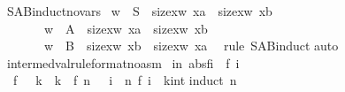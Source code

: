 \begin{isabellebody}
\isanewline
{}\ S{\isacharunderscore}A{\isacharunderscore}B{\isachardot}induct{\isacharbrackleft}no{\isacharunderscore}vars{\isacharbrackright}\isanewline
\isanewline
{}\ {\isachardoublequote}{\isacharparenleft}w\ {\isacharcolon}\ S\ {\isacharminus}{\isacharminus}{\isachargreater}\ size{\isacharbrackleft}x{\isacharcolon}w{\isachardot}\ x{\isacharequal}a{\isacharbrackright}\ {\isacharequal}\ size{\isacharbrackleft}x{\isacharcolon}w{\isachardot}\ x{\isacharequal}b{\isacharbrackright}{\isacharparenright}\ {\isacharampersand}\isanewline
\ \ \ \ \ \ \ {\isacharparenleft}w\ {\isacharcolon}\ A\ {\isacharminus}{\isacharminus}{\isachargreater}\ size{\isacharbrackleft}x{\isacharcolon}w{\isachardot}\ x{\isacharequal}a{\isacharbrackright}\ {\isacharequal}\ size{\isacharbrackleft}x{\isacharcolon}w{\isachardot}\ x{\isacharequal}b{\isacharbrackright}\ {\isacharplus}\ {}{\isacharparenright}\ {\isacharampersand}\isanewline
\ \ \ \ \ \ \ {\isacharparenleft}w\ {\isacharcolon}\ B\ {\isacharminus}{\isacharminus}{\isachargreater}\ size{\isacharbrackleft}x{\isacharcolon}w{\isachardot}\ x{\isacharequal}b{\isacharbrackright}\ {\isacharequal}\ size{\isacharbrackleft}x{\isacharcolon}w{\isachardot}\ x{\isacharequal}a{\isacharbrackright}\ {\isacharplus}\ {}{\isacharparenright}{\isachardoublequote}\isanewline
{}rule\ S{\isacharunderscore}A{\isacharunderscore}B{\isachardot}induct{\isacharparenright}\isanewline
{}auto{\isacharparenright}\isanewline
\isanewline
{}\ intermed{\isacharunderscore}val{\isacharbrackleft}rule{\isacharunderscore}format{\isacharparenleft}no{\isacharunderscore}asm{\isacharparenright}{\isacharbrackright}{\isacharcolon}\isanewline
\ {\isachardoublequote}{\isacharparenleft}{\isacharbang}i{\isacharless}n{\isachardot}\ abs{\isacharparenleft}f{\isacharparenleft}i{\isacharplus}{}{\isacharparenright}\ {\isacharminus}\ f\ i{\isacharparenright}\ {\isacharless}{\isacharequal}\ {\isacharhash}{}{\isacharparenright}\ {\isacharminus}{\isacharminus}{\isachargreater}\ \isanewline
\ \ f\ {}\ {\isacharless}{\isacharequal}\ k\ {\isacharampersand}\ k\ {\isacharless}{\isacharequal}\ f\ n\ {\isacharminus}{\isacharminus}{\isachargreater}\ {\isacharparenleft}{\isacharquery}\ i\ {\isacharless}{\isacharequal}\ n{\isachardot}\ f\ i\ {\isacharequal}\ {\isacharparenleft}k{\isacharcolon}{\isacharcolon}int{\isacharparenright}{\isacharparenright}{\isachardoublequote}\isanewline
{}induct\ n{\isacharparenright}\isanewline

\end{isabellebody}

